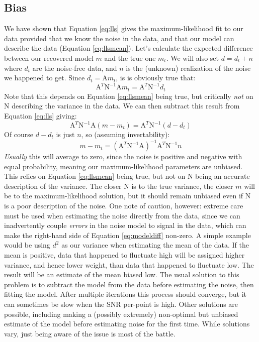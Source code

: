 \documentclass[letterpaper,11pt,preprint]{aastex}
\begin{document}
{\subsection{Bias}
We have shown that Equation \ref{eq:lls} gives the maximum-likelihood
fit to our data provided that we know the noise in the data, and that
our model can describe the data (Equation \ref{eq:llsmean}).  Let's
calculate the expected difference between our recovered model $m$ and
the true one $m_t$.  We will also set $d=d_t+n$ where $d_t$ are the
noise-free data, and $n$ is the (unknown) realization of the noise we
happened to get.  Since $d_t=\mathrm{A}m_t$, is is obviously true
that:
$$\mathrm{A}^T \mathrm{N}^{-1}\mathrm{A} m_t=\mathrm{A}^T \mathrm{N}^{-1}d_t$$
Note that this depends on Equation \ref{eq:llsmean} being true, but
critically {\textit{not}} on $\mathrm{N}$ describing the variance in
the data.  We can then subtract this result from Equation \ref{eq:lls}
giving:
\begin{equation}\label{eq:modeldiff}\mathrm{A}^T \mathrm{N}^{-1}\mathrm{A}(m-m_t)=\mathrm{A}^T
\mathrm{N}^{-1}(d-d_t)\end{equation}
Of course $d-d_t$ is just $n$, so (assuming invertability):
$$m-m_t=\left (\mathrm{A}^T \mathrm{N}^{-1}\mathrm{A} \right
)^{-1}\mathrm{A}^T\mathrm{N}^{-1}n$$
{\textit{Usually}} this will average to zero, since the noise is
positive and negative with equal probability, meaning our
maximum-likelihood parameters are unbiased.  This relies on
Equation \ref{eq:llsmean} being true, but not on $\mathrm{N}$ being an
accurate description of the variance.  The closer $\mathrm{N}$ is to
the true variance, the closer $m$ will be to the maximum-likelihood
solution, but it should remain unbiased even if $\mathrm{N}$ is a poor
description of the noise.  One note of caution, however: extreme
care must be used when estimating the noise directly from the
data, since we can inadvertently couple {\textit{errors}} in the noise
model to signal in the data, which can make the right-hand side of
Equation \ref{eq:modeldiff} non-zero.  A simple example would be using
$d^2$ as our variance when estimating the mean of the data.  If the
mean is positive, data that happened to fluctuate high will be
assigned higher variance, and hence lower weight, than data that
happened to fluctuate low.  The result will be an estimate of the mean
biased low.  The usual solution to this problem is to subtract the
model from the data before estimating the noise, then fitting the
model.  After multiple iterations this process should converge, but it
can sometimes be slow when the SNR per-point is high.  Other solutions
are possible, including making a (possibly extremely) non-optimal but
unbiased estimate of the model before estimating noise for the first
time.  While solutions vary, just being aware of the issue is most of
the battle.

}
\end{document}
